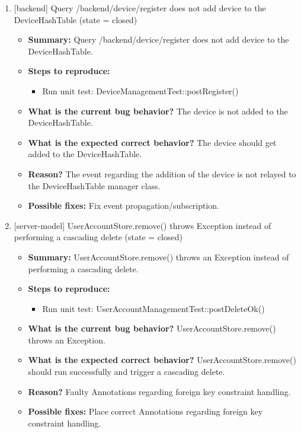 \begin{enumerate}
\item {[backend] Query /backend/device/register does not add device to the DeviceHashTable (state = closed)}
\begin{itemize}	
	\item \textbf{Summary: }Query /backend/device/register does not add device to the DeviceHashTable.\\
	\item \textbf{Steps to reproduce: }
	\begin{itemize}
		\item Run unit test: DeviceManagementTest::postRegister()\\
	\end{itemize}
	\item \textbf{What is the current bug behavior? }The device is not added to the DeviceHashTable.\\
	\item \textbf{What is the expected correct behavior? }The device should get added to the DeviceHashTable.\\
	\item \textbf{Reason? }The event regarding the addition of the device is not relayed to the DeviceHashTable manager class.\\
	\item \textbf{Possible fixes: }Fix event propagation/subscription.\\
\end{itemize}

\item {[server-model] UserAccountStore.remove() throws Exception instead of performing a cascading delete (state = closed)}
\begin{itemize}	
	\item \textbf{Summary: }UserAccountStore.remove() throws an Exception instead of performing a cascading delete.\\
	\item \textbf{Steps to reproduce: }
	\begin{itemize}
		\item Run unit test: UserAccountManagementTest::postDeleteOk()\\
	\end{itemize}
	\item \textbf{What is the current bug behavior? }UserAccountStore.remove() throws an Exception.\\
	\item \textbf{What is the expected correct behavior? }UserAccountStore.remove() should run successfully and trigger a cascading delete.\\
	\item \textbf{Reason? }Faulty Annotations regarding foreign key constraint handling.\\
	\item \textbf{Possible fixes: }Place correct Annotations regarding foreign key constraint handling.\\
\end{itemize}



\end{enumerate}
